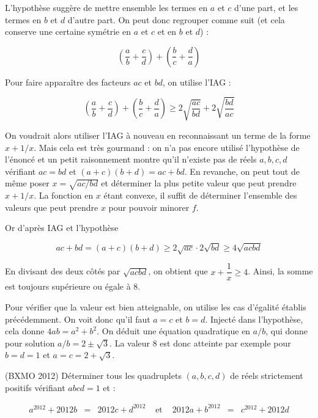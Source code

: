 \begin{sol}
L'hypothèse suggère de mettre ensemble les termes en $a$ et $c$ d'une part, et les termes en $b$ et $d$ d'autre part. On peut donc regrouper comme suit (et cela conserve une certaine symétrie en $a$ et $c$ et en $b$ et $d$) :

\[\left(\frac{a}{b} +\frac{c}{d}\right) + \left(\frac{b}{c}+\frac{d}{a}\right)\]

Pour faire apparaître des facteurs $ac$ et $bd$, on utilise l'IAG :

 \[\left(\frac{a}{b} +\frac{c}{d}\right) + \left(\frac{b}{c}+\frac{d}{a}\right) \geqslant 2\sqrt{\frac{ac}{bd}}+ 2 \sqrt{\frac{bd}{ac}}\]

 On voudrait alors utiliser l'IAG à nouveau en reconnaissant un terme de la forme $x+1/x$. Mais cela est très gourmand : on n'a pas encore utilisé l'hypothèse de l'énoncé et un petit raisonnement montre qu'il n'existe pas de réels $a,b,c,d$ vérifiant $ac=bd$ et $(a+c)(b+d)=ac+bd$. En revanche, on peut tout de même poser $x=\sqrt{ac/bd}$ et déterminer la plus petite valeur que peut prendre $x+1/x$. La fonction en $x$ étant convexe, il suffit de déterminer l'ensemble des valeurs que peut prendre $x$ pour pouvoir minorer $f$.

\medskip

Or d'après IAG et l'hypothèse

\[ac+bd= (a+c)(b+d) \geqslant 2\sqrt{ac}\cdot 2 \sqrt{bd} \geqslant 4 \sqrt{acbd}\]

En divisant des deux côtés par $\sqrt{acbd}$, on obtient que $x+\dfrac1{x} \geqslant 4$. Ainsi, la somme est toujours supérieure ou égale à $8$.

\medskip

Pour vérifier que la valeur est bien atteignable, on utilise les cas d'égalité établis précédemment. On voit donc qu'il faut $a=c$ et $b=d$. Injecté dans l'hypothèse, cela donne $4ab=a^2+b^2$. On déduit une équation quadratique en $a/b$, qui donne pour solution $a/b= 2\pm \sqrt{3}$. La valeur $8$ est donc atteinte par exemple pour $b=d=1$ et $a=c=2+\sqrt{3}$.
\end{sol}


\begin{exo}
(BXMO 2012)
Déterminer tous les quadruplets $(a,b,c,d)$ de réels strictement positifs vérifiant $abcd=1$ et :

\[\begin{array}{lllllll}
a^{2012}+2012b &=& 2012c+d^{2012} &\text{ et } & 2012a+b^{2012} &=& c^{2012}+2012d\\
\end{array}\]
\end{exo}

